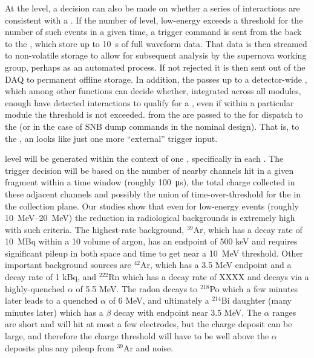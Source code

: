 At the  level, a decision can also be made on whether
a series of interactions are consistent with a . 
If the number of  level, low-energy
 exceeds a threshold for the number of such
events in a given time, a trigger command is sent from the 
back to the , which store up to \SI{10}{\s} of full
waveform data. 
That data is then streamed to non-volatile storage to allow for
subsequent analysis by the supernova working group, perhaps as an
automated process. 
If not rejected it is then sent out of the DAQ to permanent offline
storage.
In addition, the  passes  up to a
detector-wide , which among other functions can decide
whether, integrated across all modules, enough  have
detected interactions to qualify for a , even if within a
particular module the threshold is not exceeded. 
 from the  are passed to the
 for dispatch to the  (or  in the
case of SNB dump commands in the nominal design). 
That is, to the , an  looks like just
one more ``external'' trigger input.

 level  will be generated within
the context of one , specifically in each . 
The trigger decision will be based on the number of nearby channels
hit in a given fragment within a time window (roughly \SI{100}{\us}),
the total charge collected in these adjacent channels and possibly the
union of time-over-threshold for the  in the
collection plane.
Our studies show that even for low-energy events (roughly
\SIrange{10}{20}{\MeV}) the reduction in radiological backgrounds is
extremely high with such criteria.
The highest-rate background, $^{39}$Ar, which has a decay rate of
10~MBq within a \SI{10}{\kton} volume of argon, has an endpoint of 500
keV and requires significant pileup in both space and time to get near
a \SI{10}{\MeV} threshold.
Other important background sources are $^{42}$Ar, which has a 3.5 MeV
endpoint and a decay rate of 1 kBq, and $^{222}$Rn which has a decay
rate of XXXX and decays via a highly-quenched $\alpha$ of 5.5 MeV.
The radon decays to $^{218}$Po which a few minutes later leads to a
quenched $\alpha$ of 6 MeV, and ultimately a $^{214}$Bi daughter (many
minutes later) which has a $\beta$ decay with endpoint near 3.5 MeV. 
The $\alpha$ ranges are short and will hit at most a few electrodes,
but the charge deposit can be large, and therefore the charge
threshold will have to be well above the $\alpha$ deposits plus any
pileup from $^{39}$Ar and noise.

